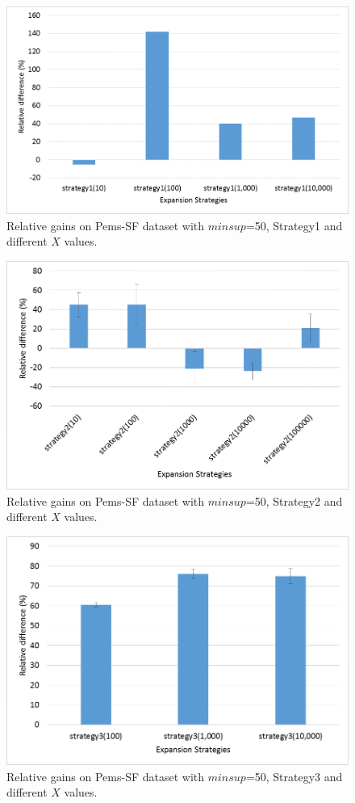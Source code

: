 \begin{figure}[!t]
\includegraphics[width=5in]{immagini_extension/pems_strategy1.png}
\caption{Relative gains on Pems-SF dataset with $minsup$=50, Strategy1 and different $X$ values.
}
\label{pems_strategy1}
\end{figure}

\begin{figure}[!t]
\includegraphics[width=5in]{immagini_extension/pems_strategy2.png}
\caption{Relative gains on Pems-SF dataset with $minsup$=50, Strategy2 and different $X$ values.
}
\label{pems_strategy2}
\end{figure}

\begin{figure}[!t]
\includegraphics[width=5in]{immagini_extension/pems_strategy3.png}
\caption{Relative gains on Pems-SF dataset with $minsup$=50, Strategy3 and different $X$ values.
}
\label{pems_strategy3}
\end{figure}


